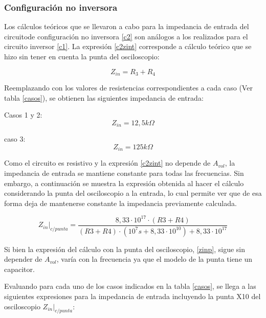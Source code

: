 \subsubsection*{Configuraci\'on no inversora}

Los c\'alculos te\'oricos que se llevaron a cabo para la impedancia de entrada del circuitode configuraci\'on no inversora \ref{c2} son an\'alogos a los realizados para el circuito inversor \ref{c1}. La expresi\'on \ref{c2zint} corresponde a c\'alculo te\'orico que se hizo sin tener en cuenta la punta del osciloscopio:

\begin{equation}
	Z_{in} =  R_3 + R_4
	\label{c2zint}
\end{equation}

Reemplazando con los valores de resistencias correspondientes a cada caso (Ver tabla \ref{casos}), se obtienen las siguientes impedancia de entrada:

Casos 1 y 2:
\begin{equation}
	Z_{in} =  12,5k\Omega
	\label{c2c1zint}
\end{equation}

caso 3:
\begin{equation}
	Z_{in} =  125k\Omega
	\label{c3c3zint}
\end{equation}

Como el circuito es resistivo y la expresi\'on \ref{c2zint} no depende de $A_{vol}$, la impedancia de entrada se mantiene constante para todas las frecuencias. Sin embargo, a continuaci\'on se muestra la expresi\'on obtenida al hacer el c\'alculo considerando la punta del osciloscopio a la entrada, lo cual permite ver que de esa forma deja de mantenerse constante la impedancia previamente calculada.


\begin{equation}
	Z_{in}\rvert_{c/punta} = \frac{8,33 \cdot 10^{17} \cdot (R3 + R4)}{(R3 + R4) \cdot (10^7 s + 8,33 \cdot 10^{10}) + 8,33 \cdot 10^{17}}
	\label{zinp}
\end{equation}

Si bien la expresi\'on del c\'alculo con la punta del osciloscopio, \ref{zinp}, sigue sin depender de $A_{vol}$, var\'ia con la frecuencia ya que el modelo de la punta tiene un capacitor.

Evaluando para cada uno de los casos indicados en la tabla \ref{casos}, se llega a las siguientes expresiones para la impedancia de entrada incluyendo la punta X10 del osciloscopio $Z_{in}\rvert_{c/punta}$:

